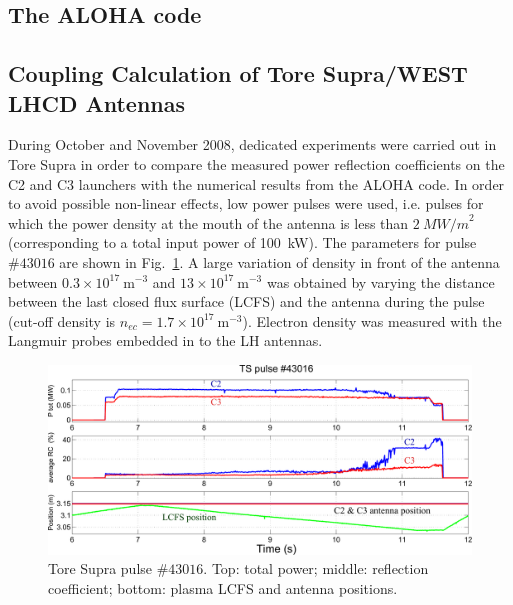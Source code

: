 \subsection{The ALOHA code}\label{sec:ALOHA}




\subsection{Coupling Calculation of Tore Supra/WEST LHCD Antennas}

During October and November 2008, dedicated experiments were carried out in Tore Supra in order to compare the measured power reflection coefficients on the C2 and C3 launchers with the numerical results from the ALOHA code. In order to avoid possible non-linear effects\cite{petrzilka1987, ekedahl2009}, low power pulses were used, i.e. pulses for which the power density at the mouth of the antenna is less than $2~\si{MW/m}^2$ (corresponding to a total input power of 100~kW). The parameters for pulse $\#43016$ are shown in Fig.~\ref{fig:TS43016}. A large variation of density in front of the antenna between $0.3\times10^{17}~\mathrm{m}^{-3}$ and $13\times10^{17}~\mathrm{m}^{-3}$ was obtained by varying the distance between the last closed flux surface (LCFS) and the antenna during the pulse (cut-off density is $n_{ec}=1.7\times10^{17}~\mathrm{m}^{-3}$). Electron density was measured with the Langmuir probes embedded in to the LH antennas. 

\begin{figure}[h]
	\includegraphics{figures/chap2/Tore_Supra/TS43016}
	\caption{Tore Supra pulse $\#43016$. Top: total power; middle: reflection coefficient; bottom: plasma LCFS and antenna positions.}
	\label{fig:TS43016}
\end{figure}


